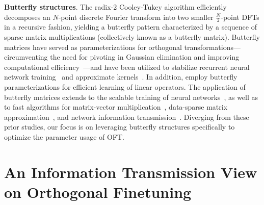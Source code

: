 \textbf{Butterfly structures}. The radix-2 Cooley-Tukey algorithm efficiently decomposes an $N$-point discrete Fourier transform into two smaller $\frac{N}{2}$-point DFTs in a recursive fashion, yielding a butterfly pattern characterized by a sequence of sparse matrix multiplications (collectively known as a butterfly matrix). Butterfly matrices have served as parameterizations for orthogonal transformations—circumventing the need for pivoting in Gaussian elimination and improving computational efficiency~\cite{parker1995random}—and have been utilized to stabilize recurrent neural network training~\cite{jing2017tunable} and approximate kernels~\cite{munkhoeva2018quadrature}. In addition, \cite{dao2019learning,dao2019kaleidoscope} employ butterfly parameterizations for efficient learning of linear operators. The application of butterfly matrices extends to the scalable training of neural networks~\cite{chen2022pixelated,dao2022monarch}, as well as to fast algorithms for matrix-vector multiplication~\cite{michielssen1996multilevel,o2010algorithm}, data-sparse matrix approximation~\cite{li2015butterfly}, and network information transmission~\cite{klasing1994broadcasting,li2003linear,rajasingh2016transmission}. Diverging from these prior studies, our focus is on leveraging butterfly structures specifically to optimize the parameter usage of OFT.

\section{An Information Transmission View on Orthogonal Finetuning}

